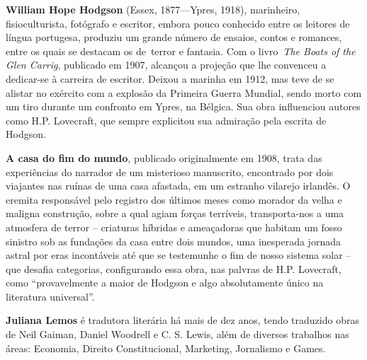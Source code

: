 \textbf{William Hope Hodgson} (Essex, 1877---Ypres, 1918), marinheiro, fisioculturista, 
fotógrafo e escritor, embora pouco conhecido entre os leitores de língua portugesa, 
produziu um grande número de ensaios, contos e romances, entre os quais se destacam 
os de terror e fantasia. Com o livro \textit{The Boats of the Glen Carrig}, publicado em 1907,
alcançou a projeção que lhe convenceu a dedicar-se à carreira de escritor. 
Deixou a marinha em 1912, mas teve de se alistar no exército com a explosão da Primeira Guerra Mundial,
sendo morto com um tiro durante um confronto em Ypres, na Bélgica.
Sua obra influenciou autores como H.P. Lovecraft, que sempre explicitou sua admiração pela escrita
de Hodgson. 



\textbf{A casa do fim do mundo}, publicado originalmente em 1908, 
trata das experiências do narrador de um misterioso manuscrito, 
encontrado por dois viajantes nas ruínas de uma casa afastada, 
em um estranho vilarejo irlandês. O eremita responsável pelo registro dos últimos meses 
como morador da velha e maligna construção, sobre a qual agiam forças terríveis, transporta-nos
a uma atmosfera de terror -- criaturas híbridas e ameaçadoras que habitam um fosso sinistro 
sob as fundações da casa entre dois mundos, uma inesperada jornada astral por eras incontáveis 
até que se testemunhe o fim de nosso sistema solar -- que desafia categorias,
configurando essa obra, nas palvras de H.P. Lovecraft, como ``provavelmente a maior de Hodgson 
e algo absolutamente único na literatura universal''.



\textbf{Juliana Lemos} é tradutora literária há mais de dez anos, tendo traduzido obras de Neil Gaiman, 
Daniel Woodrell e C. S. Lewis, além de diversos trabalhos nas áreas: 
Economia, Direito Constitucional, Marketing, Jornalismo e Games.